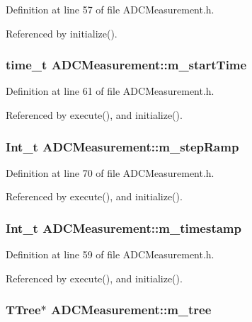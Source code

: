 Definition at line 57 of file ADCMeasurement.h.

Referenced by initialize().\hypertarget{classADCMeasurement_a5c2c98ec69e2331906b0eb41a826508e}{
\subsubsection[{m\_\-startTime}]{\setlength{\rightskip}{0pt plus 5cm}time\_\-t {\bf ADCMeasurement::m\_\-startTime}}}
\label{classADCMeasurement_a5c2c98ec69e2331906b0eb41a826508e}


Definition at line 61 of file ADCMeasurement.h.

Referenced by execute(), and initialize().\hypertarget{classADCMeasurement_aa73b7cbd45e13df16291ff740f6140fe}{
\subsubsection[{m\_\-stepRamp}]{\setlength{\rightskip}{0pt plus 5cm}Int\_\-t {\bf ADCMeasurement::m\_\-stepRamp}}}
\label{classADCMeasurement_aa73b7cbd45e13df16291ff740f6140fe}


Definition at line 70 of file ADCMeasurement.h.

Referenced by execute(), and initialize().\hypertarget{classADCMeasurement_a1fa77f5df72a81eab7e55e97d4bea27f}{
\subsubsection[{m\_\-timestamp}]{\setlength{\rightskip}{0pt plus 5cm}Int\_\-t {\bf ADCMeasurement::m\_\-timestamp}}}
\label{classADCMeasurement_a1fa77f5df72a81eab7e55e97d4bea27f}


Definition at line 59 of file ADCMeasurement.h.

Referenced by execute(), and initialize().\hypertarget{classADCMeasurement_ac218556f79d8a0533b292e96347ccd29}{
\subsubsection[{m\_\-tree}]{\setlength{\rightskip}{0pt plus 5cm}TTree$\ast$ {\bf ADCMeasurement::m\_\-tree}}}
\label{classADCMeasurement_ac218556f79d8a0533b292e96347ccd29}


